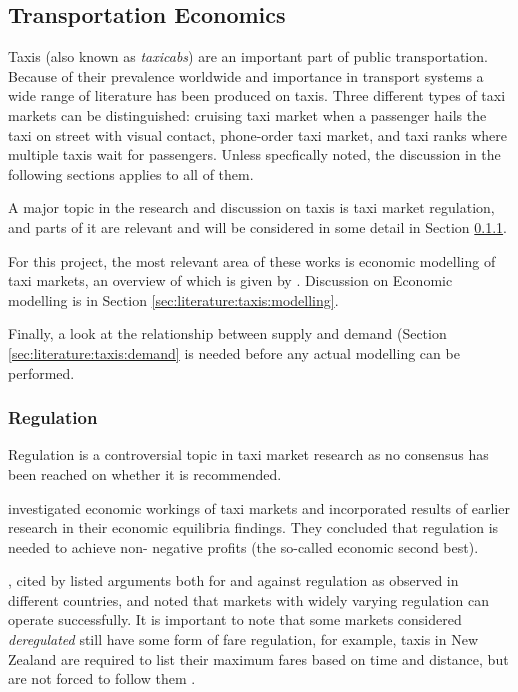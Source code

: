 \subsection{Transportation Economics}
\label{sec:literature:taxis}

Taxis (also known as \textit{taxicabs}) are an important part of public
transportation. Because of their prevalence worldwide and importance in
transport systems a wide range of literature has been produced on taxis. Three
different types of taxi markets can be distinguished: cruising taxi market when
a passenger hails the taxi on street with visual contact, phone-order taxi
market, and taxi ranks where multiple taxis wait for passengers. Unless
specfically noted, the discussion in the following sections applies to all of
them.

A major topic in the research and discussion on taxis is taxi market
regulation, and parts of it are relevant and will be considered in some detail
in Section \ref{sec:literature:taxis:regulation}.

For this project, the most relevant area of these works is economic modelling
of taxi markets, an overview of which is given by
\textcite{Salanova2011taxi+review}. Discussion on Economic modelling is in
Section \ref{sec:literature:taxis:modelling}.

Finally, a look at the relationship between supply and demand (Section
\ref{sec:literature:taxis:demand} is needed before any actual modelling can be
performed.


\subsubsection{Regulation}
\label{sec:literature:taxis:regulation}

Regulation is a controversial topic in taxi market research as no consensus has
been reached on whether it is recommended.

\textcite{Cairns1996taxi+competition} investigated economic workings of taxi
markets and incorporated results of earlier research in their economic
equilibria findings. They concluded that regulation is needed to achieve non-
negative profits (the so-called economic second best).

\textcite{Oecd2007taxi+policy}, cited by \textcite{Salanova2011taxi+review}
listed arguments both for and against regulation as observed in different
countries, and noted that markets with widely varying regulation can operate
successfully. It is important to note that some markets considered
\textit{deregulated} still have some form of fare regulation, for example,
taxis in New Zealand are required to list their maximum fares based on time and
distance, but are not forced to follow them
\parencite{Gaunt1995taxi+newzealand}.


